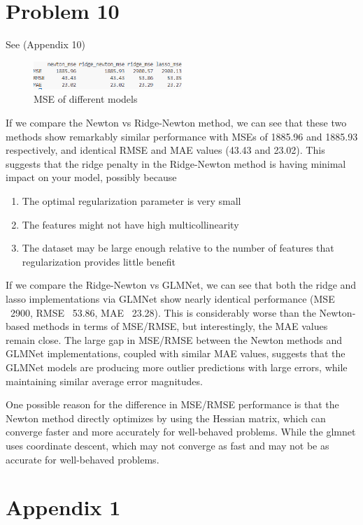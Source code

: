 \documentclass{article}
\begin{document}
\section*{Problem 10}
See (Appendix 10)
\begin{figure}[h]
    \centering
    \includegraphics[width=0.5\textwidth]{10.png}
    \caption{MSE of different models}
\end{figure}

If we compare the Newton vs Ridge-Newton method, we can see that these two methods show remarkably similar performance with MSEs of 1885.96 and 1885.93 respectively, and identical RMSE and MAE values (43.43 and 23.02). This suggests that the ridge penalty in the Ridge-Newton method is having minimal impact on your model, possibly because
\begin{enumerate}
    \item The optimal regularization parameter is very small
    \item The features might not have high multicollinearity
    \item The dataset may be large enough relative to the number of features that regularization provides little benefit
\end{enumerate}

If we compare the Ridge-Newton vs GLMNet, we can see that both the ridge and lasso implementations via GLMNet show nearly identical performance (MSE ~2900, RMSE ~53.86, MAE ~23.28). This is considerably worse than the Newton-based methods in terms of MSE/RMSE, but interestingly, the MAE values remain close. The large gap in MSE/RMSE between the Newton methods and GLMNet implementations, coupled with similar MAE values, suggests that the GLMNet models are producing more outlier predictions with large errors, while maintaining similar average error magnitudes.

One possible reason for the difference in MSE/RMSE performance is that the Newton method directly optimizes by using the Hessian matrix, which can converge faster and more accurately for well-behaved problems. While the glmnet uses coordinate descent, which may not converge as fast and may not be as accurate for well-behaved problems. \cite{Tay2023}

\newpage


\newpage
\section*{Appendix 1}
\inputminted{r}{q1.r}
\end{document}
